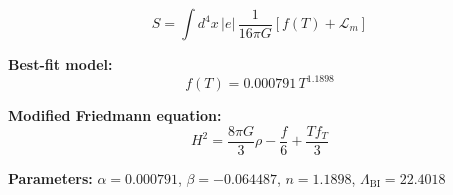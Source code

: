 
\begin{equation}
  S = \int d^4x \, |e| \, \frac{1}{16\pi G} \left[ f(T) + \mathcal{L}_m \right]
\end{equation}

\textbf{Best-fit model:}
\begin{equation}
  f(T) = 0.000791 \, T^{1.1898}
\end{equation}

\textbf{Modified Friedmann equation:}
\begin{equation}
  H^2 = \frac{8\pi G}{3} \rho - \frac{f}{6} + \frac{T f_T}{3}
\end{equation}

\textbf{Parameters:}
$\alpha = 0.000791$, \quad
$\beta = -0.064487$, \quad
$n = 1.1898$, \quad
$\Lambda_{\text{BI}} = 22.4018$